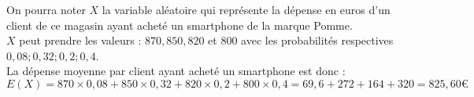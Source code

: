 \documentclass[10pt]{article}
\begin{document}
On pourra noter $X$ la variable aléatoire qui représente la dépense en euros d'un client de ce magasin ayant acheté un smartphone de la marque Pomme.\\
$X$ peut prendre les valeurs : $870, 850, 820$ et $800$ avec les probabilités respectives $0,08; 0,32; 0,2 ; 0,4$.\\
La dépense moyenne par client ayant acheté un smartphone est donc :
	\[E(X)=
	870 \times 0,08 + 850 \times 0,32 + 820 \times 0,2 + 800 \times 0,4 = 69,6 + 272 + 164 + 320 = 825,60 \text{€}
	\]
\end{document}
